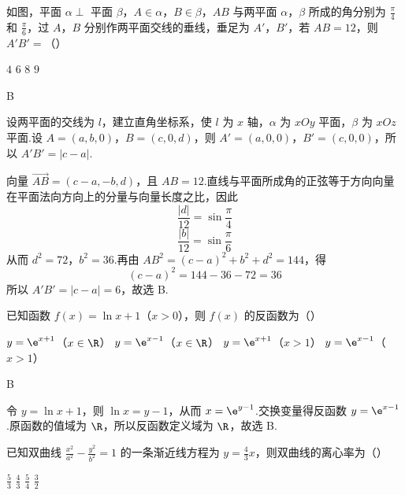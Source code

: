 \begin{problem}
如图，平面 \(\alpha \perp\) 平面 \(\beta\)，\(A \in \alpha\)，\(B \in \beta\)，\(AB\) 与两平面 \(\alpha\)，\(\beta\) 所成的角分别为 \(\frac{\pi}{4}\) 和 \(\frac{\pi}{6}\)，过 \(A\)，\(B\) 分别作两平面交线的垂线，垂足为 \(A'\)，\(B'\)，若 \(AB = 12\)，则 \(A'B' =\)（\quad）


\choices
    {\(4\)}
    {\(6\)}
    {\(8\)}
    {\(9\)}
\end{problem}

\begin{answer}
B
\end{answer}

\begin{solution}
设两平面的交线为 \(l\)，建立直角坐标系，使 \(l\) 为 \(x\) 轴，\(\alpha\) 为 \(xOy\) 平面，\(\beta\) 为 \(xOz\) 平面.设
\(A=(a,b,0)\)，\(B=(c,0,d)\)，则 \(A'=(a,0,0)\)，\(B'=(c,0,0)\)，所以 \(A'B'=|c-a|\).

向量 \(\overrightarrow{AB}=(c-a,-b,d)\)，且 \(AB=12\).直线与平面所成角的正弦等于方向向量在平面法向方向上的分量与向量长度之比，因此
\[
\frac{|d|}{12}=\sin\frac{\pi}{4}
\]
\[
\frac{|b|}{12}=\sin\frac{\pi}{6}
\]
从而 \(d^{2}=72\)，\(b^{2}=36\).再由 \(AB^{2}=(c-a)^{2}+b^{2}+d^{2}=144\)，得
\[
(c-a)^{2}=144-36-72=36
\]
所以 \(A'B'=|c-a|=6\)，故选 B.
\end{solution}

\begin{problem}
已知函数 \( f(x) = \ln x + 1 \)（\(x > 0\)），则 \( f(x) \) 的反函数为（\quad）

\choices
    {\( y = \e^{x + 1} \)（\(x \in \R\)）}
    {\( y = \e^{x - 1} \)（\(x \in \R\)）}
    {\( y = \e^{x + 1} \)（\(x > 1\)）}
    {\( y = \e^{x - 1} \)（\(x > 1\)）}
\end{problem}

\begin{answer}
B
\end{answer}

\begin{solution}
令 \(y=\ln x+1\)，则 \(\ln x=y-1\)，从而 \(x=\e^{y-1}\).交换变量得反函数
\(y=\e^{x-1}\).原函数的值域为 \(\R\)，所以反函数定义域为 \(\R\)，故选 B.
\end{solution}

\begin{problem}
已知双曲线 \(\frac{x^2}{a^2} - \frac{y^2}{b^2} = 1\) 的一条渐近线方程为 \(y = \frac{4}{3} x\)，则双曲线的离心率为（\quad）

\choices
    {\( \frac{5}{3} \)}
    {\( \frac{4}{3} \)}
    {\( \frac{5}{4} \)}
    {\( \frac{3}{2} \)}
\end{problem}

